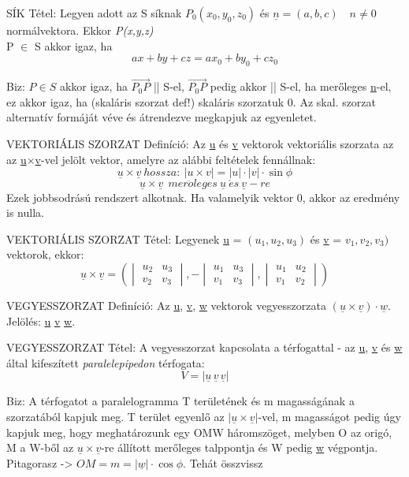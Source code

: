 \documentclass[]{article}
\newcommand{\Und}[1]{\underline{#1}}
\begin{document}
\begin{framed}
SÍK Tétel: Legyen adott az S síknak $P_0(x_0,y_0,z_0)$ és $\underline{n} = (a,b,c)\quad n\neq0$ normálvektora. Ekkor \textit{P(x,y,z)}\\ P $\in$ S akkor igaz, ha
$$ax+by+cz=ax_0+by_0+cz_0$$
\end{framed}
\begin{leftbar}
Biz: $P \in S$ akkor igaz, ha $\vec{P_0P}$ || S-el, $\vec{P_0P}$ pedig akkor || S-el, ha merőleges \underline{n}-el, ez akkor igaz, ha (skaláris szorzat def!) skaláris szorzatuk 0. Az skal. szorzat alternatív formáját véve és átrendezve megkapjuk az egyenletet.
\end{leftbar}
\begin{shaded}
VEKTORIÁLIS SZORZAT Definíció: Az \underline{u} és \underline{v} vektorok vektoriális szorzata az az \underline{u}×\underline{v}-vel jelölt
vektor, amelyre az alábbi feltételek fennállnak:
$$\underline{u} \times \underline{v}\: hossza:\: |u \times v| = |u| \cdot |v| \cdot\sin\phi$$
$$\underline{u} \times \underline{v}\ \: mer\ddot{o}leges\: \underline{u}\: \acute{e}s\: \underline{v}-re$$
Ezek jobbsodrású rendszert alkotnak. Ha valamelyik vektor 0, akkor az eredmény is nulla.
\end{shaded}
\begin{framed}
VEKTORIÁLIS SZORZAT Tétel: Legyenek \underline{u} = $(u_1,u_2,u_3)$ és \underline{v} = $v_1,v_2,v_3)$ vektorok, ekkor:
$$\underline{u}\times\underline{v} = \left( \begin{vmatrix}
u_2&u_3\\v_2&v_3\end{vmatrix},-\begin{vmatrix}
u_1&u_3\\v_1&v_3\end{vmatrix},\begin{vmatrix}
u_1&u_2\\v_1&v_2\end{vmatrix} \right)$$
\end{framed}
\begin{shaded}
VEGYESSZORZAT Definíció: Az \Und{u}, \Und{v}, \Und{w}  vektorok vegyesszorzata $(\Und{u}\times\Und{v})\cdot\Und{w}$.\\Jelölés: \Und{u} \Und{v} \Und{w}.
\end{shaded}
\begin{framed}
VEGYESSZORZAT Tétel: A vegyesszorzat kapcsolata a térfogattal - az \Und{u}, \Und{v} és \Und{w} által kifeszített \textit{paralelepipedon} térfogata:
$$V = |\Und{u}\, \Und{v}\, \Und{v}|$$
\end{framed}
\begin{leftbar}
Biz: A térfogatot a paralelogramma T területének és m magasságának a szorzatából kapjuk meg. T terület egyenlő az $|\Und{u}\times\Und{v}|$-vel, m magasságot pedig úgy kapjuk meg, hogy meghatározunk egy OMW háromszöget, melyben O az origó, M a W-ből az $\Und{u}\times\Und{v}$-re állított merőleges talppontja és W pedig \Und{w} végpontja. Pitagorasz -> $OM = m = |\Und{w}| \cdot \cos\phi$. Tehát összvissz 
\end{leftbar}
\end{document}
